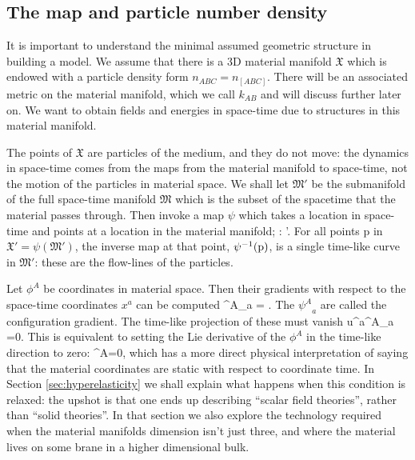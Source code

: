 \subsection{The map and particle number density}
\label{sec:mpnd}
It is important to understand the minimal assumed geometric structure in building a model. We  assume that there is a 3D material manifold $\mathfrak{X}$ which is endowed with a particle density form $n_{ABC} = n_{[ABC]}$. There will be an associated metric on the material manifold, which we call $k_{AB}$ and will discuss further later on. We want to obtain fields and energies in space-time due to structures in this material manifold. 

The points of $\mathfrak{X}$ are  particles of the medium, and they do not move: the dynamics in space-time comes from the maps from the material manifold to space-time, not the motion of the particles in material space.  We shall let  $\mathfrak{M}'$ be the submanifold of the full space-time manifold $\mathfrak{M}$  which is the subset of the spacetime that the material passes through. Then invoke a map $\psi$ which takes a location in space-time and points at a location in the material manifold;
\bea
\psi : '\longrightarrow {}.
\eea
For all points p in $\mathfrak{X}' = \psi(\mathfrak{M}')$, the inverse map at that point, $\psi^{-1}({\rm p})$, is a single time-like curve in $\mathfrak{M}'$: these are the flow-lines of the particles. 

Let $\phi^A$ be   coordinates in material space. Then their gradients with respect to the space-time coordinates $x^a$ can be computed
\bea
\label{eq:sec:config_gradient}
{\psi^A}_a = .
\eea
The ${\psi^A}_a$ are called the configuration gradient. The time-like projection of these must vanish
\bea
\label{eq:sec:ortho-condition}
u^a{\psi^A}_a =0.
\eea
This is equivalent to setting the Lie derivative of the $\phi^A$ in the time-like direction to zero:
\bea
{}\phi^A=0,
\eea
which has a more direct physical interpretation of saying that the material coordinates are static with respect to coordinate time. In Section \ref{sec:hyperelasticity} we shall explain what happens when this condition is relaxed: the upshot is that one ends up describing ``scalar field theories'', rather than ``solid theories''.  In that section we also explore the technology required when the material manifolds dimension isn't just three, and where the material lives on some brane in a higher dimensional bulk.

